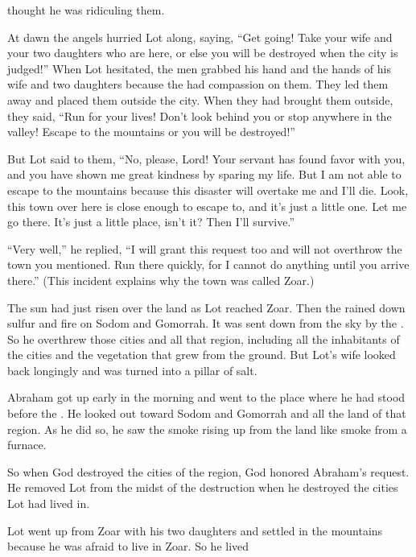 {thought he was ridiculing them.
\par }{\PP {}At dawn
the angels
hurried
Lot
along, saying,
“Get
going! Take
your wife
and your two
daughters
who
are here, or else
you will be destroyed
when the city
is judged!”
When
Lot hesitated,
the men
grabbed
his hand
and the hands
of his wife
and two
daughters
because the
{}
had compassion
on
them. They led
them away and placed
them outside
the city.
When
they had brought
them outside,
they said,
“Run
for your lives! Don’t
look
behind
you
or stop
anywhere
in the valley! Escape
to the mountains
or
you will be destroyed!”
\par }{\PP {}But Lot
said
to
them, “No,
please,
Lord!
Your
servant
has
found
favor
with you, and you have
shown me great
kindness
by sparing
my life.
But I am
not
able
to escape
to the mountains
because
this disaster
will overtake
me and I’ll
die.
Look,
this town
over here is close
enough to escape
to, and it’s just a little
one.
Let
me go there.
It’s just a little place,
isn’t
it? Then I’ll survive.”
\par }{\PP {}“Very well,” he replied, “I
will grant
this
request
too
and will not
overthrow
the town
you mentioned.
Run
there
quickly,
for
I cannot
do
anything
until
you arrive
there.”
(This incident
explains
why the town
was called
Zoar.)
\par }{\PP {}The sun
had just risen
over
the land
as Lot
reached
Zoar.
Then the
{}
rained
down sulfur
and fire
on
Sodom
and Gomorrah.
It was sent down from
the sky
by the
{}.
So he overthrew
those
cities
and all
that region,
including all
the inhabitants
of the cities
and the vegetation that grew
from the ground.
But Lot’s
wife
looked
back
longingly and was turned into a pillar
of salt.
\par }{\PP {}Abraham
got up early
in the morning
and went to
the place
where
he had
stood
before
the {}.
He looked
out toward
Sodom
and Gomorrah
and all
the land
of that region.
As he did so, he saw
the smoke
rising up from
the land
like smoke
from a furnace.
\par }{\PP {}So when
God
destroyed
the cities
of the region,
God
honored
Abraham’s
request.
He removed Lot
from the midst
of the destruction
when he destroyed
the cities
Lot
had
lived in.
\par }{\PP {}Lot
went up
from Zoar
with
his two
daughters
and settled
in the mountains
because
he was afraid
to live
in Zoar.
So he lived
}
